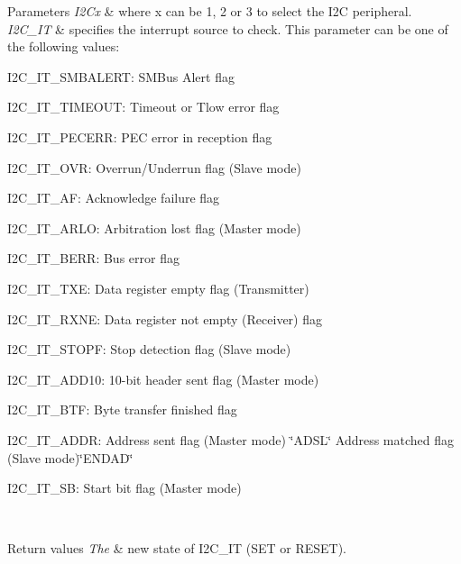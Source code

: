 \begin{DoxyParams}{Parameters}
{\em I2\+Cx} & where x can be 1, 2 or 3 to select the I2C peripheral. \\
\hline
{\em I2\+C\+\_\+\+IT} & specifies the interrupt source to check. This parameter can be one of the following values\+: \begin{DoxyItemize}
\item I2\+C\+\_\+\+I\+T\+\_\+\+S\+M\+B\+A\+L\+E\+RT\+: S\+M\+Bus Alert flag \item I2\+C\+\_\+\+I\+T\+\_\+\+T\+I\+M\+E\+O\+UT\+: Timeout or Tlow error flag \item I2\+C\+\_\+\+I\+T\+\_\+\+P\+E\+C\+E\+RR\+: P\+EC error in reception flag \item I2\+C\+\_\+\+I\+T\+\_\+\+O\+VR\+: Overrun/\+Underrun flag (Slave mode) \item I2\+C\+\_\+\+I\+T\+\_\+\+AF\+: Acknowledge failure flag \item I2\+C\+\_\+\+I\+T\+\_\+\+A\+R\+LO\+: Arbitration lost flag (Master mode) \item I2\+C\+\_\+\+I\+T\+\_\+\+B\+E\+RR\+: Bus error flag \item I2\+C\+\_\+\+I\+T\+\_\+\+T\+XE\+: Data register empty flag (Transmitter) \item I2\+C\+\_\+\+I\+T\+\_\+\+R\+X\+NE\+: Data register not empty (Receiver) flag \item I2\+C\+\_\+\+I\+T\+\_\+\+S\+T\+O\+PF\+: Stop detection flag (Slave mode) \item I2\+C\+\_\+\+I\+T\+\_\+\+A\+D\+D10\+: 10-\/bit header sent flag (Master mode) \item I2\+C\+\_\+\+I\+T\+\_\+\+B\+TF\+: Byte transfer finished flag \item I2\+C\+\_\+\+I\+T\+\_\+\+A\+D\+DR\+: Address sent flag (Master mode) \char`\"{}\+A\+D\+S\+L\char`\"{} Address matched flag (Slave mode)\char`\"{}\+E\+N\+D\+A\+D\char`\"{} \item I2\+C\+\_\+\+I\+T\+\_\+\+SB\+: Start bit flag (Master mode) \end{DoxyItemize}
\\
\hline
\end{DoxyParams}

\begin{DoxyRetVals}{Return values}
{\em The} & new state of I2\+C\+\_\+\+IT (S\+ET or R\+E\+S\+ET). \\
\hline
\end{DoxyRetVals}
\mbox{\label{group___i2_c_ga29237aea9b5a3ead33167e1d027e9f1a}} 
